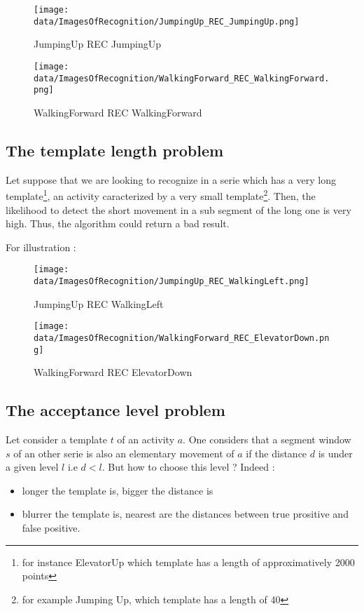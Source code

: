 \documentclass[a4,12pt]{article}
\begin{document}
		\begin{figure}[H]
		\centering
		\texttt{[image: data/ImagesOfRecognition/JumpingUp\_REC\_JumpingUp.png]}
		\caption{JumpingUp REC JumpingUp}
		\label{JumpingUp_REC_JumpingUp}
	\end{figure}
	
	\begin{figure}[H]
		\centering
		\texttt{[image: data/ImagesOfRecognition/WalkingForward\_REC\_WalkingForward.png]}
		\caption{WalkingForward REC WalkingForward}
		\label{JumpingUp_REC_JumpingUp}
	\end{figure}
	
	\subsection{The template length problem} 
	
	Let suppose that we are looking to recognize in a serie which has a very long template\footnote{for instance ElevatorUp which template has a length of approximatively 2000 points}, an activity caracterized by a very small template\footnote{for example Jumping Up, which template has a length of 40}. Then, the likelihood to detect the short movement in a sub segment of the long one is very high. Thus, the algorithm  could return a bad result.
	
	For illustration :
	
	\begin{figure}[H]
		\centering
		\texttt{[image: data/ImagesOfRecognition/JumpingUp\_REC\_WalkingLeft.png]}
		\caption{JumpingUp REC WalkingLeft}
		\label{JumpingUp_REC_JumpingUp}
	\end{figure}
	
	\begin{figure}[H]
		\centering
		\texttt{[image: data/ImagesOfRecognition/WalkingForward\_REC\_ElevatorDown.png]}
		\caption{WalkingForward REC ElevatorDown}
		\label{JumpingUp_REC_JumpingUp}
	\end{figure}

	
	\subsection{The acceptance level problem}
	
	Let consider a template $t$ of an activity $a$.
	One considers that a segment window $s$ of an other serie is also an elementary movement of $a$ if the distance $d$ is under a given level $l$ i.e $d<l$.
	But how to choose this level ? Indeed :
	\begin{itemize}
		\item longer the template is, bigger the distance is
		\item blurrer the template is, nearest are the distances between true prositive and false positive.
	\end{itemize}
\end{document}
